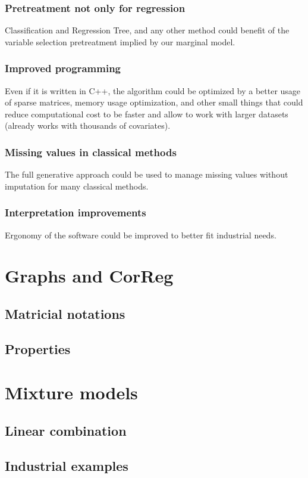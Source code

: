\documentclass[11pt,a4paper]{report}
\begin{document}
		\subsection{Pretreatment not only for regression}
			Classification and Regression Tree, and any other method could benefit of the variable selection pretreatment implied by our marginal model.
		\subsection{Improved programming}
			Even if it is written in C++, the algorithm could be optimized by a better usage of sparse matrices, memory usage optimization, and other small things that could reduce computational cost to be faster and allow to work with larger datasets (already works with thousands of covariates).
		\subsection{Missing values in classical methods}
			The full generative approach could be used to manage missing values without imputation for many classical methods.
		\subsection{Interpretation improvements}
			Ergonomy of the software could be improved to better fit industrial needs.
\cleardoublepage



\appendix
	\chapter{Graphs and CorReg}
		\section{Matricial notations}
		\section{Properties}
	\chapter{Mixture models}
		\section{Linear combination}
			
		\section{Industrial examples}	
\end{document}
